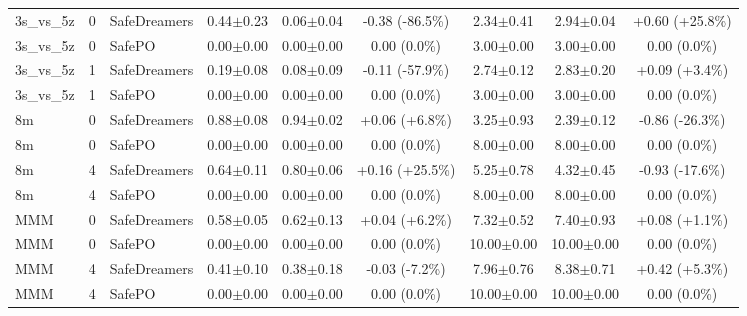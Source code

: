 \documentclass{article}
\begin{document}
\begin{longtable}{lclcccccc}
\midrule
3s\_vs\_5z & 0 & SafeDreamers & 0.44$\pm$0.23 & 0.06$\pm$0.04 & \textcolor{red!100!black}{-0.38 (-86.5\%)} & 2.34$\pm$0.41 & 2.94$\pm$0.04 & \textcolor{red!70!black}{+0.60 (+25.8\%)} \\
3s\_vs\_5z & 0 & SafePO & 0.00$\pm$0.00 & 0.00$\pm$0.00 & \textcolor{red!40!black}{0.00 (0.0\%)} & 3.00$\pm$0.00 & 3.00$\pm$0.00 & \textcolor{green!40!black}{0.00 (0.0\%)} \\
3s\_vs\_5z & 1 & SafeDreamers & 0.19$\pm$0.08 & 0.08$\pm$0.09 & \textcolor{red!100!black}{-0.11 (-57.9\%)} & 2.74$\pm$0.12 & 2.83$\pm$0.20 & \textcolor{red!40!black}{+0.09 (+3.4\%)} \\
3s\_vs\_5z & 1 & SafePO & 0.00$\pm$0.00 & 0.00$\pm$0.00 & \textcolor{red!40!black}{0.00 (0.0\%)} & 3.00$\pm$0.00 & 3.00$\pm$0.00 & \textcolor{green!40!black}{0.00 (0.0\%)} \\
\midrule
8m & 0 & SafeDreamers & 0.88$\pm$0.08 & 0.94$\pm$0.02 & \textcolor{green!55!black}{+0.06 (+6.8\%)} & 3.25$\pm$0.93 & 2.39$\pm$0.12 & \textcolor{green!70!black}{-0.86 (-26.3\%)} \\
8m & 0 & SafePO & 0.00$\pm$0.00 & 0.00$\pm$0.00 & \textcolor{red!40!black}{0.00 (0.0\%)} & 8.00$\pm$0.00 & 8.00$\pm$0.00 & \textcolor{green!40!black}{0.00 (0.0\%)} \\
8m & 4 & SafeDreamers & 0.64$\pm$0.11 & 0.80$\pm$0.06 & \textcolor{green!70!black}{+0.16 (+25.5\%)} & 5.25$\pm$0.78 & 4.32$\pm$0.45 & \textcolor{green!70!black}{-0.93 (-17.6\%)} \\
8m & 4 & SafePO & 0.00$\pm$0.00 & 0.00$\pm$0.00 & \textcolor{red!40!black}{0.00 (0.0\%)} & 8.00$\pm$0.00 & 8.00$\pm$0.00 & \textcolor{green!40!black}{0.00 (0.0\%)} \\
\midrule
MMM & 0 & SafeDreamers & 0.58$\pm$0.05 & 0.62$\pm$0.13 & \textcolor{green!55!black}{+0.04 (+6.2\%)} & 7.32$\pm$0.52 & 7.40$\pm$0.93 & \textcolor{red!40!black}{+0.08 (+1.1\%)} \\
MMM & 0 & SafePO & 0.00$\pm$0.00 & 0.00$\pm$0.00 & \textcolor{red!40!black}{0.00 (0.0\%)} & 10.00$\pm$0.00 & 10.00$\pm$0.00 & \textcolor{green!40!black}{0.00 (0.0\%)} \\
MMM & 4 & SafeDreamers & 0.41$\pm$0.10 & 0.38$\pm$0.18 & \textcolor{red!55!black}{-0.03 (-7.2\%)} & 7.96$\pm$0.76 & 8.38$\pm$0.71 & \textcolor{red!55!black}{+0.42 (+5.3\%)} \\
MMM & 4 & SafePO & 0.00$\pm$0.00 & 0.00$\pm$0.00 & \textcolor{red!40!black}{0.00 (0.0\%)} & 10.00$\pm$0.00 & 10.00$\pm$0.00 & \textcolor{green!40!black}{0.00 (0.0\%)} \\

\end{longtable}
\end{document}

